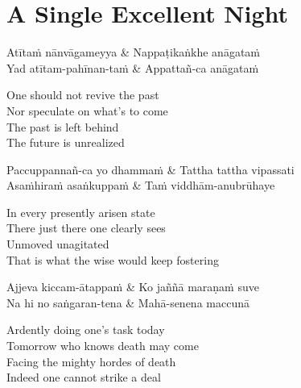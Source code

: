 \clearpage

\section{A Single Excellent Night}

\begin{leader}
\end{leader}

\begin{twochants}
  Atītaṁ nānvāgameyya & Nappaṭikaṅkhe anāgataṁ\\
  Yad atītam-pahīnan-taṁ & Appattañ-ca anāgataṁ\\
\end{twochants}

\begin{english}
  One should not revive the past\\
  Nor speculate on what’s to come\\
  The past is left behind\\
  The future is unrealized
\end{english}

\begin{twochants}
  Paccuppannañ-ca yo dhammaṁ & Tattha tattha vipassati\\
  Asaṁhiraṁ asaṅkuppaṁ & Taṁ viddhām-anubrūhaye\\
\end{twochants}

\begin{english}
  In every presently arisen state\\
  There just there one clearly sees\\
  Unmoved unagitated\\
  That is what the wise would keep fostering
\end{english}

\begin{twochants}
  Ajjeva kiccam-ātappaṁ & Ko jaññā maraṇaṁ suve\\
  Na hi no saṅgaran-tena & Mahā-senena maccunā\\
\end{twochants}

\begin{english}
  Ardently doing one’s task today\\
  Tomorrow who knows death may come\\
  Facing the mighty hordes of death\\
  Indeed one cannot strike a deal
\end{english}

